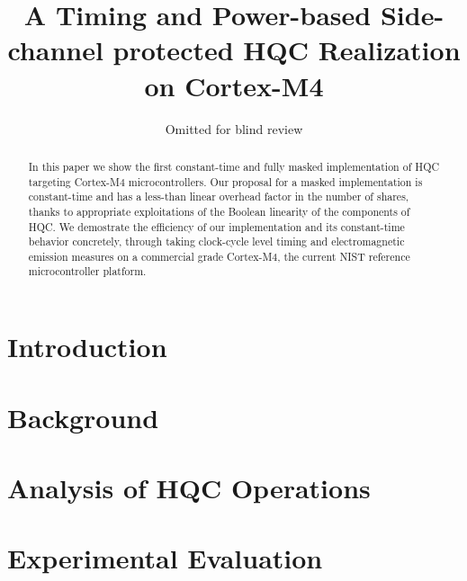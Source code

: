 \documentclass[runningheads, 10pt]{llncs}
\title{A Timing and Power-based Side-channel protected HQC Realization on Cortex-M4}
\author{Omitted for blind review}
\institute{Omitted for blind review}
\begin{document}
%
%
\maketitle              %
%
%
\begin{abstract}
    In this paper we show the first constant-time and fully masked implementation of HQC targeting Cortex-M$4$ microcontrollers. 
    Our proposal for a masked implementation is constant-time and
    has a less-than linear overhead factor in the number of shares, thanks to 
    appropriate exploitations of the Boolean linearity of the components
    of HQC.
    We demostrate the efficiency of our implementation and its constant-time 
    behavior concretely, through taking clock-cycle level timing and 
    electromagnetic emission measures on a commercial grade Cortex-M$4$, the 
    current NIST reference microcontroller platform.
\end{abstract}
%
%
\section{Introduction}\label{sec:intro}

%
%
%
\vspace{-0.2cm}
\section{Background}\label{sec:background}

%
%
\vspace{-0.2cm}
\section{Analysis of HQC Operations}\label{sec:implem}

%
%
\vspace{-0.2cm}
\section{Experimental Evaluation}\label{sec:expres}

%
%
\vspace{-0.4cm}
\end{document}
